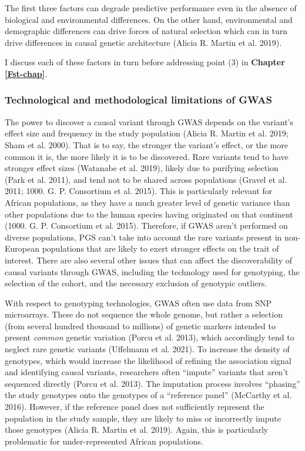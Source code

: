 \documentclass[
]{book}
\begin{document}
The first three factors can degrade predictive performance even in the absence of biological and environmental differences. On the other hand, environmental and demographic differences can drive forces of natural selection which can in turn drive differences in causal genetic architecture (Alicia R. Martin et al. 2019).

I discuss each of these factors in turn before addressing point (3) in \textbf{Chapter \ref{Fst-chap}}.

\hypertarget{fst-discovery-sec}{%
\subsubsection{Technological and methodological limitations of GWAS}\label{fst-discovery-sec}}

The power to discover a causal variant through GWAS depends on the variant's effect size and frequency in the study population (Alicia R. Martin et al. 2019; Sham et al. 2000). That is to say, the stronger the variant's effect, or the more common it is, the more likely it is to be discovered. Rare variants tend to have stronger effect sizes (Watanabe et al. 2019), likely due to purifying selection (Park et al. 2011), and tend not to be shared across populations (Gravel et al. 2011; 1000. G. P. Consortium et al. 2015). This is particularly relevant for African populations, as they have a much greater level of genetic variance than other populations due to the human species having originated on that continent (1000. G. P. Consortium et al. 2015). Therefore, if GWAS aren't performed on diverse populations, PGS can't take into account the rare variants present in non-European populations that are likely to exert stronger effects on the trait of interest. There are also several other issues that can affect the discoverability of causal variants through GWAS, including the technology used for genotyping, the selection of the cohort, and the necessary exclusion of genotypic outliers.

With respect to genotyping technologies, GWAS often use data from SNP microarrays. These do not sequence the whole genome, but rather a selection (from several hundred thousand to millions) of genetic markers intended to present \emph{common} genetic variation (Porcu et al. 2013), which accordingly tend to neglect rare genetic variants (Uffelmann et al. 2021). To increase the density of genotypes, which would increase the likelihood of refining the association signal and identifying causal variants, researchers often ``impute'' variants that aren't sequenced directly (Porcu et al. 2013). The imputation process involves ``phasing'' the study genotypes onto the genotypes of a ``reference panel'' (McCarthy et al. 2016). However, if the reference panel does not sufficiently represent the population in the study sample, they are likely to miss or incorrectly impute those genotypes (Alicia R. Martin et al. 2019). Again, this is particularly problematic for under-represented African populations.
\end{document}
